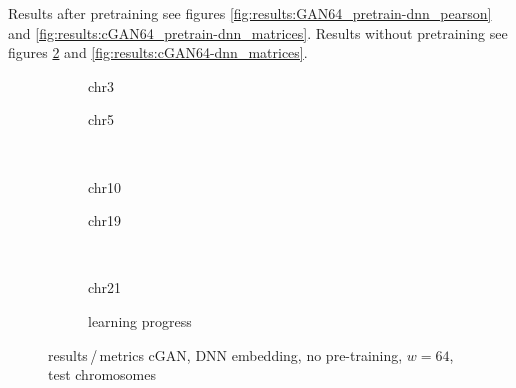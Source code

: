 Results after pretraining see figures \ref{fig:results:GAN64_pretrain-dnn_pearson} and \ref{fig:results:cGAN64_pretrain-dnn_matrices}.
Results without pretraining see figures \ref{fig:results:GAN64-dnn_pearson} and \ref{fig:results:cGAN64-dnn_matrices}.
\begin{figure}[p] %
    \begin{subfigure}{0.45\textwidth}
        \scriptsize
        \caption{chr3}
    \end{subfigure} \hfill
    \begin{subfigure}{0.45\textwidth}
        \scriptsize
        \caption{chr5}
    \end{subfigure}\\[5mm]
    \begin{subfigure}{0.45\textwidth}
        \scriptsize
        \caption{chr10}
    \end{subfigure}\hfill
    \begin{subfigure}{0.45\textwidth}
        \scriptsize
        \caption{chr19}
    \end{subfigure}\\[3mm]
    \begin{subfigure}{0.45\textwidth}
        \scriptsize
        \caption{chr21}
    \end{subfigure} \hfill
    \begin{subfigure}{0.45\textwidth}
        \scriptsize
        \caption{learning progress} \label{fig:results:GAN64-dnn_lossEpochs}
    \end{subfigure}
    \caption{results\,/\,metrics cGAN, DNN embedding, no pre-training, $w=64$, test chromosomes}   \label{fig:results:GAN64-dnn_pearson}
\end{figure}
